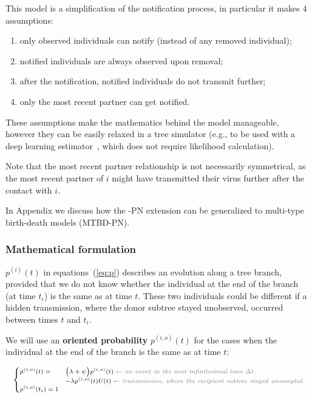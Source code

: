 \documentclass[a4paper,10pt]{article}
\begin{document}
This model is a simplification of the notification process, in particular it makes 4 assumptions:
\begin{enumerate}
\item only observed individuals can notify (instead of any removed individual);
\item notified individuals are always observed upon removal;
\item after the notification, notified individuals do not transmit further;
\item only the most recent partner can get notified.
\end{enumerate}

These assumptions make the mathematics behind the model manageable, however they can be easily relaxed in a tree simulator (e.g., to be used with a deep learning estimator~\citep{Voznica2021}, which does not require likelihood calculation).

Note that the most recent partner relationship is not necessarily symmetrical, as the most recent partner of $i$ might have transmitted their virus further after the contact with $i$. 

In Appendix we discuss how the -PN extension can be generalized to multi-type birth-death models (MTBD-PN).

\subsubsection{Mathematical formulation}
$p^{(i)}(t)$ in equations~(\ref{eq:p}) describes an evolution along a tree branch, provided that we do not know whether the individual at the end of the branch (at time $t_i$) is the same as at time $t$. These two individuals could be different if a hidden transmission, where the donor subtree stayed unobserved, occurred between times $t$ and $t_i$.

We will use an \textbf{oriented probability} $p^{(i,o)}(t)$ for the cases when the individual at the end of the branch is the same as at time $t$:

\begin{equation}
\scriptsize
\begin{cases}
\dot{p}^{(i,o)}(t) = & \Big(\lambda + \psi\Big) p^{(i,o)}(t)\; \textit{\color{gray} $\leftarrow$ no event in the next infinitesimal time $\Delta t$ }\\
    & - \lambda p^{(i,o)}(t)U(t)\;  \textit{\color{gray} $\leftarrow$ transmission, where the recipient subtree stayed unsampled}\\
p^{(i,o)}(t_i) = 1\label{eq:p-o}
\end{cases}
\end{equation}
\end{document}
